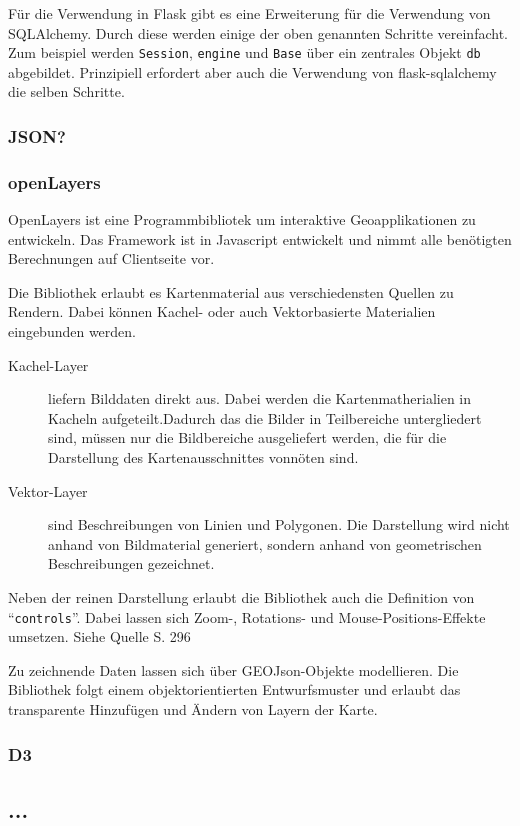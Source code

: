     
    Für die Verwendung in Flask gibt es eine Erweiterung für die Verwendung von SQLAlchemy. Durch diese werden einige der oben genannten Schritte vereinfacht. Zum beispiel werden \texttt{Session}, \texttt{engine} und \texttt{Base} über ein zentrales Objekt \texttt{db} abgebildet. Prinzipiell erfordert aber auch die Verwendung von flask-sqlalchemy die selben Schritte.
    
    
    \subsubsection{JSON?}

    \subsubsection{openLayers}
    
    OpenLayers ist eine Programmbibliotek um interaktive Geoapplikationen zu entwickeln. Das Framework ist in Javascript entwickelt und nimmt alle benötigten Berechnungen auf Clientseite vor.
    
    Die Bibliothek erlaubt es Kartenmaterial aus verschiedensten Quellen zu Rendern. Dabei können Kachel- oder auch Vektorbasierte Materialien eingebunden werden.
    
    \begin{description}
     \item [Kachel-Layer]  liefern Bilddaten direkt aus. Dabei werden die Kartenmatherialien in Kacheln aufgeteilt.Dadurch das die Bilder in Teilbereiche untergliedert sind, müssen nur die Bildbereiche ausgeliefert werden, die für die Darstellung des Kartenausschnittes vonnöten sind.
     
     \item [Vektor-Layer] sind Beschreibungen von Linien und Polygonen. Die Darstellung wird nicht anhand von Bildmaterial generiert, sondern anhand von geometrischen Beschreibungen gezeichnet. 
    \end{description}
    
    Neben der reinen Darstellung erlaubt die Bibliothek auch die Definition von  "`\texttt{controls}"'. Dabei lassen sich Zoom-, Rotations- und Mouse-Positions-Effekte umsetzen. Siehe Quelle \cite{openlayersbeginnersguide} S. 296
    
    Zu zeichnende Daten lassen sich über GEOJson-Objekte modellieren. Die Bibliothek folgt einem objektorientierten Entwurfsmuster und erlaubt das transparente Hinzufügen und Ändern von Layern der Karte.

    \subsubsection{D3}
    
    \subsection{...}

